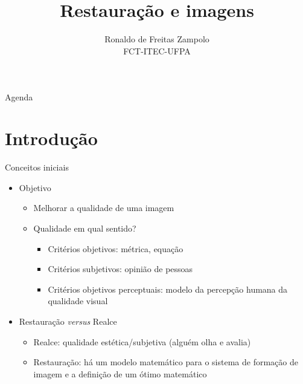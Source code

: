 


\title{\cursogrande\\ \vspace{1cm}Restauração e imagens}
\author{Ronaldo de Freitas Zampolo\\FCT-ITEC-UFPA}


   \maketitle[randomdots={false}]
   \begin{slide}{Agenda}
      \tableofcontents[content=sections]
   \end{slide}

\section[ slide = true]{Introdução}
   \begin{slide}[toc=]{Conceitos iniciais}
      \begin{itemize}
       \item Objetivo
	       \begin{itemize}
		       \item Melhorar a qualidade de uma imagem
		       \item Qualidade em qual sentido? 
			       \begin{itemize}
				       \item Critérios objetivos: métrica, equação
				       \item Critérios subjetivos: opinião de pessoas
				       \item Critérios objetivos perceptuais: modelo da percepção humana da qualidade visual
			       \end{itemize}
	       \end{itemize}
       \item Restauração \emph{versus} Realce 
	       \begin{itemize}
		       \item Realce: qualidade estética/subjetiva (alguém olha e avalia)
		       \item Restauração: há um modelo matemático para o sistema de formação de imagem e a definição de um ótimo matemático
	       \end{itemize}
       \end{itemize}
   \end{slide}

